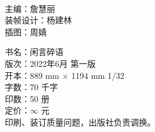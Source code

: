 \documentclass[twoside,openany]{ctexbook}
\begin{document}

\thispagestyle{empty}

\thispagestyle{empty}
\newpage
\ %
\thispagestyle{empty}
\newpage



\thispagestyle{empty}


\clearpage

\thispagestyle{empty}
\vspace*{\fill}

\begin{flushleft}
  \begingroup

  主\hspace*{2\ccwd}编：詹慧丽\\
  装帧设计：杨建林\\
  插\hspace*{2\ccwd}图：周\hspace*{1\ccwd}婧\\
  \endgroup
\end{flushleft}
\vspace{3em}
\begin{flushleft}

  \begingroup

  书\hspace*{2\ccwd}名：闲言碎语\\
  版\hspace*{2\ccwd}次：2022年6月 第一版\\
  开\hspace*{2\ccwd}本：889 mm $\times$ 1194 mm  1/32\\
  字\hspace*{2\ccwd}数：70 千字\\
  印\hspace*{2\ccwd}数：50 册\\
  定\hspace*{2\ccwd}价：$\infty$ 元\\
  \vspace{2em}
  印刷、装订质量问题，出版社负责调换。
  \endgroup
\end{flushleft}

\clearpage

\thispagestyle{empty}
\vspace*{1em}
\noindent{}
\newpage

\thispagestyle{empty}
\
\newpage

\thispagestyle{empty}

\newpage

\thispagestyle{empty}
\
\newpage

\thispagestyle{empty}
\setcounter{page}{1}
\heiti{\tableofcontents}

\songti
\mainmatter
\hypersetup{pageanchor=true}


% 












%
\thispagestyle{empty}

\end{document}
